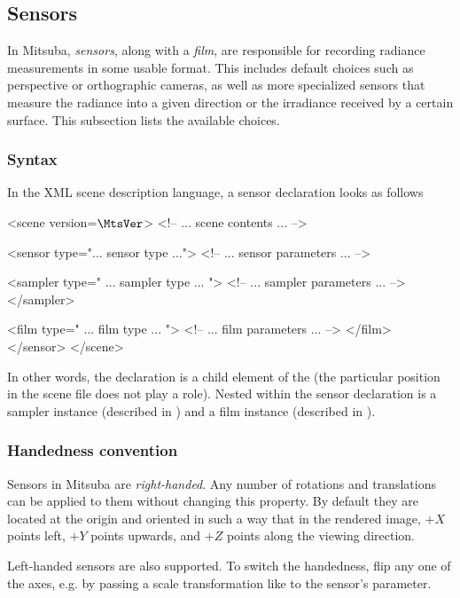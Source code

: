 \newpage
\subsection{Sensors}
\label{sec:sensors}
In Mitsuba, \emph{sensors}, along with a \emph{film}, are responsible for recording radiance
measurements in some usable format. This includes default choices such as perspective
or orthographic cameras, as well as more specialized sensors that measure the radiance
into a given direction or the irradiance received by a certain surface. This subsection
lists the available choices.

\subsubsection*{Syntax}
In the XML scene description language, a sensor declaration looks as follows
\begin{xml}
<scene version=$\MtsVer$>
    <!-- ... scene contents ... -->

    <sensor type="... sensor type ...">
        <!-- ... sensor parameters ... -->

        <sampler type=" ... sampler type ... ">
            <!-- ... sampler parameters ... -->
        </sampler>

        <film type=" ... film type ... ">
            <!-- ... film parameters ... -->
        </film>
    </sensor>
</scene>
\end{xml}
In other words, the  declaration is a child element of the  (the particular
position in the scene file does not play a role). Nested within the sensor declaration is a
sampler instance (described in ) and a film instance (described in
).

\subsubsection*{Handedness convention}
Sensors in Mitsuba are \emph{right-handed}.
Any number of rotations and translations can be applied to them
without changing this property. By default they are located at the
origin and oriented in such a way that in the rendered image, $+X$ points left,
$+Y$ points upwards, and $+Z$ points along the viewing direction.

Left-handed sensors are also supported. To switch the handedness,
flip any one of the axes, e.g. by passing a scale transformation like
 to the sensor's  parameter.
